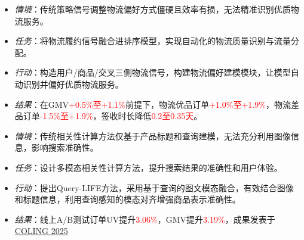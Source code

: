 \documentclass{resume}
\begin{document}
\begin{itemize}
  \item \textit{情境}：传统策略信号调整物流偏好方式僵硬且效率有损，无法精准识别优质物流服务。
  \item \textit{任务}：将物流履约信号融合进排序模型，实现自动化的物流质量识别与流量分配。
  \item \textit{行动}：构造用户/商品/交叉三侧物流信号，构建物流偏好建模模块，让模型自动识别并偏好优质物流服务。
  \item \textit{结果}：在GMV\textcolor{red}{+0.5\%至+1.1\%}前提下，物流优品订单\textcolor{red}{+1.0\%至+1.9\%}，物流差品订单\textcolor{red}{-1.5\%至+1.9\%}，签收时长降低\textcolor{red}{0.2至0.35天}。
\end{itemize}

\begin{itemize}
  \item \textit{情境}：传统相关性计算方法仅基于产品标题和查询建模，无法充分利用图像信息，影响搜索准确性。
  \item \textit{任务}：设计多模态相关性计算方法，提升搜索结果的准确性和用户体验。
  \item \textit{行动}：提出Query-LIFE方法，采用基于查询的图文模态融合，有效结合图像和标题信息，利用查询感知的模态对齐增强商品表示准确性。
  \item \textit{结果}：线上A/B测试订单UV提升\textcolor{red}{3.06\%}，GMV提升\textcolor{red}{3.19\%}，成果发表于\href{https://aclanthology.org/2025.coling-industry.2.pdf}{COLING 2025}
\end{itemize}



\end{document}
